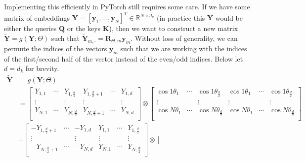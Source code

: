 \documentclass[11pt,addpoints,answers]{exam}
\newcommand{\Rb}{\mathbb{R}}
\newcommand{\yv}{\mathbf{y}}
\newcommand{\Kv}{\mathbf{K}}
\newcommand{\Qv}{\mathbf{Q}}
\newcommand{\Rv}{\mathbf{R}}
\newcommand{\Yv}{\mathbf{Y}}
\begin{document}
\begin{questions}
    Implementing this efficiently in PyTorch still requires some care. If we have some matrix of embeddings $\Yv = [\yv_1, \ldots, \yv_N]^T \in \Rb^{N \times d_k}$ (in practice this $\Yv$ would be either the queries $\Qv$ or the keys $\Kv$), then we want to construct a new matrix $\tilde{\Yv} = g(\Yv; \Theta)$ such that $\tilde{\Yv}_{m, \cdot} = \Rv_{\Theta,m} \yv_m$. Without loss of generality, we can permute the indices of the vectors $\yv_m$ such that we are working with the indices of the first/second half of the vector instead of the even/odd indices.
    Below let $d = d_k$ for brevity.
    {\small 
    \begin{align*}
        \tilde{\Yv} &= g(\Yv; \Theta) \\
        &= \left[ \begin{array}{ccc|ccc} 
            Y_{1,1} & \cdots & Y_{1,\frac{d}{2}} & Y_{1,\frac{d}{2}+1} & \cdots & Y_{1,d} \\
            \vdots & & \vdots & \vdots & & \vdots \\
            Y_{N,1} & \cdots & Y_{N,\frac{d}{2}} & Y_{N,\frac{d}{2}+1} & \cdots & Y_{N,d} \\
        \end{array} \right] 
        \otimes
        \left[ \begin{array}{ccc|ccc} 
            \cos 1 \theta_1 & \cdots & \cos 1 \theta_{\frac{d}{2}} & \cos 1 \theta_1 & \cdots & \cos 1 \theta_{\frac{d}{2}} \\
            \vdots & & \vdots & \vdots & & \vdots \\
            \cos N \theta_1 & \cdots & \cos N \theta_{\frac{d}{2}} & \cos N \theta_1 & \cdots & \cos N \theta_{\frac{d}{2}} \\
        \end{array} \right] 
        \\
        &+\left[ \begin{array}{ccc|ccc} 
            -Y_{1,\frac{d}{2}+1} & \cdots & -Y_{1,d} & Y_{1,1} & \cdots & Y_{1,\frac{d}{2}} \\
            \vdots & & \vdots & \vdots & & \vdots \\
            -Y_{N,\frac{d}{2}+1} & \cdots & -Y_{N,d} & Y_{N,1} & \cdots & Y_{N,\frac{d}{2}}  \\
        \end{array} \right] 
        \otimes
        \left[ \begin{array}{ccc|ccc} 

\end{array}
\end{align*}}
\end{questions}
\end{document}
